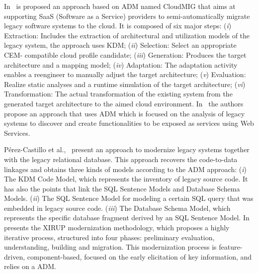 In~\cite{5741334, SMR:SMR582} is proposed an approach based on ADM named CloudMIG that aims at supporting SaaS (Software as a Service) providers to semi-automatically migrate legacy software systems to the cloud. It is composed of six major steps: (\textit{i}) Extraction: Includes the extraction of architectural and utilization models of the legacy system, the approach uses KDM; (\textit{ii}) Selection: Select an appropriate CEM- compatible cloud profile candidate; (\textit{iii}) Generation: Produces the target architecture and a mapping model; (\textit{iv}) Adaptation: The adaptation activity enables a reengineer to manually adjust the target architecture; (\textit{v}) Evaluation: Realize static analyses and a runtime simulation of the target architecture; (\textit{vi}) Transformation: The actual transformation of the existing system from the generated target architecture to the aimed cloud environment. In~\cite{4400179} the authors propose an approach that uses ADM which is focused on the analysis of legacy systems to discover and create functionalities to be exposed as services using Web Services.

 P\'{e}rez-Castillo et al.,~\cite{5328801, delCastillo:2009:PRP:1529282.1529753, ICEISPerez:CastilloGCP12} present an approach to modernize legacy systems together with the legacy relational database. This approach recovers the code-to-data linkages and obtains three kinds of models according to the ADM approach: (\textit{i}) The KDM Code Model, which represents the inventory of legacy source code. It has also the points that link the SQL Sentence Models and Database Schema Models. (\textit{ii}) The SQL Sentence Model for modeling a certain SQL query that was embedded in legacy source code. (\textit{iii}) The Database Schema Model, which represents the specific database fragment derived by an SQL Sentence Model. In~\cite{FuentesFernandez2012247} presents the XIRUP modernization methodology, which proposes a highly iterative process, structured into four phases: preliminary evaluation, understanding, building and migration. This modernization process is feature-driven, component-based, focused on the early elicitation of key information, and relies on a ADM.


